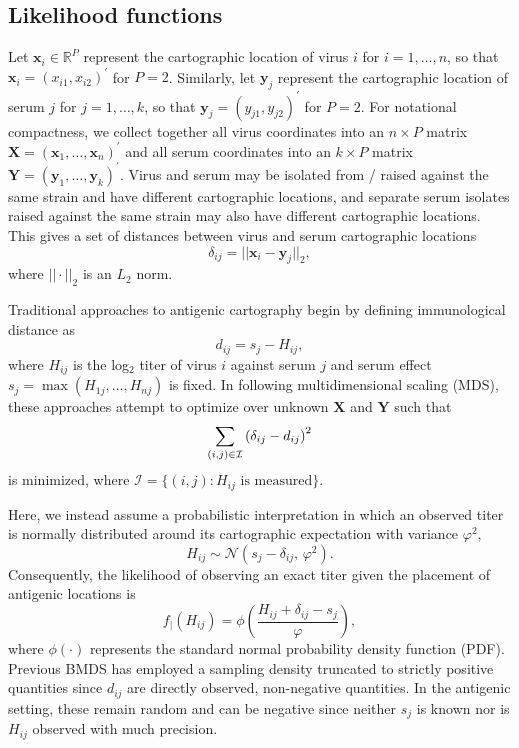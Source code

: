 \documentclass[11pt,oneside,letterpaper]{article}
\newcommand{\virus}{\mathbf{x}}						%
\newcommand{\serum}{\mathbf{y}}						%
\newcommand{\viruses}{\mathbf{X}}					%
\newcommand{\sera}{\mathbf{Y}}						%
\newcommand{\se}{s}									%
\newcommand{\point}{f_{\scriptscriptstyle \vert}}	%
\newcommand{\mdssd}{\varphi}						%
\newcommand{\vn}{n}									%
\newcommand{\sn}{k}									%
\newcommand{\normal}{\mathcal{N}}					%
\begin{document}
\subsection*{Likelihood functions}

Let $\virus_i \in \mathbb{R}^{P}$ represent the cartographic location of virus $i$ for $i = 1,\ldots,\vn$, so that $\virus_i = (x_{i1}, x_{i2})^{\prime}$ for $P=2$. 
Similarly, let $\serum_j$ represent the cartographic location of serum $j$ for $j = 1,\ldots,\sn$, so that $\serum_j = (y_{j1},y_{j2})^{\prime}$ for $P=2$.
For notational compactness, we collect together all virus coordinates into an $\vn \times P$ matrix  $\viruses = (\virus_1, \ldots, \virus_{\vn})^{\prime}$ and all serum coordinates into an $\sn \times P$ matrix $\sera = (\serum_{1},\ldots,\serum_{\sn})^{\prime}$.
Virus and serum may be isolated from / raised against the same strain and have different cartographic locations, and separate serum isolates raised against the same strain may also have different cartographic locations. 
This gives a set of distances between virus and serum cartographic locations 
\begin{equation}
	\delta_{ij} =  || \virus_i - \serum_j ||_2,
\end{equation}
where $|| \cdot ||_2$ is an $L_2$ norm.

Traditional approaches to antigenic cartography \cite{Smith04} begin by defining immunological distance as
\begin{equation}
	d_{ij} =  \se_j - H_{ij},
\end{equation}
where $H_{ij}$ is the log$_2$ titer of virus $i$ against serum $j$ and serum effect $\se_j = \max ( H_{1j},\ldots,H_{\vn j} )$ is fixed.
In following multidimensional scaling (MDS), these approaches attempt to optimize over unknown $\viruses$ and $\sera$ such that
\begin{equation}
	\sum_{(i,j) \in \cal I} 
	\left(
		\delta_{ij} - d_{ij}
	\right)^2
\end{equation}
is minimized, where $\mathcal{I} = \{ (i,j) : H_{ij} \mbox{ is measured} \}$.

Here, we instead assume a probabilistic interpretation in which an observed titer is normally distributed around its cartographic expectation with variance $\mdssd^2$,
\begin{equation} \label{hij}
	H_{ij} \sim \normal( \se_j - \delta_{ij}, \, \mdssd^2 ).
\end{equation}
Consequently, the likelihood of observing an exact titer given the placement of antigenic locations is 
\begin{equation} 
	\point(H_{ij}) = \phi \left( \frac{ H_{ij} + \delta_{ij} - \se_j }{ \mdssd } \right),
\end{equation}
where $\phi(\cdot)$ represents the standard normal probability density function (PDF).
Previous BMDS has employed a sampling density truncated to strictly positive quantities since $d_{ij}$ are directly observed, non-negative quantities.  
In the antigenic setting, these remain random and can be negative since neither $\se_j$ is known nor is $H_{ij}$ observed with much precision. 
\end{document}
